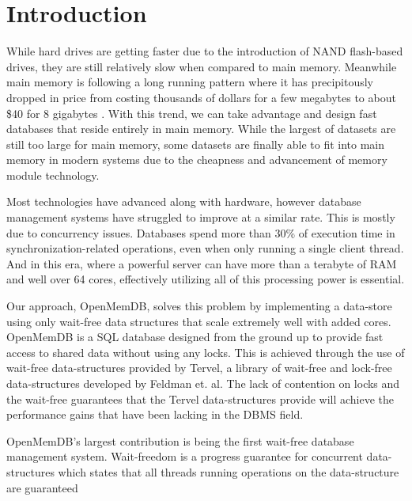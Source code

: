 \documentclass[conference, compsoc]{IEEEtran}
\begin{document}
\section{Introduction}
While hard drives are getting faster due to the introduction of NAND flash-based drives,
they are still relatively slow when compared to main memory. Meanwhile main memory is 
following a long running pattern where it has precipitously dropped in price from costing 
thousands of dollars for a few megabytes to about \$40 for 8 gigabytes \cite{jcmit}. 
With this trend, we can take advantage and design fast databases that reside entirely in main memory. While the largest of datasets are still too large for main memory, 
some datasets are finally able to fit into main memory in modern systems due to the 
cheapness and advancement of memory module technology. 
\par\vspace{\baselineskip}
Most technologies have advanced 
along with hardware, however database management systems have struggled to improve
at a similar rate. This is mostly due to concurrency issues. Databases spend more than 30\% 
of execution time in synchronization-related operations, even when only running a single
client thread\cite{soares2015database}. And in this era, where a powerful server
can have more than a terabyte of RAM and well over 64 cores, effectively utilizing all of 
this processing power is essential. 
\par\vspace{\baselineskip}
Our approach, OpenMemDB, solves this problem by implementing a data-store 
using only wait-free data structures that scale extremely well with added cores. 
OpenMemDB is a SQL database designed from the ground up to provide fast access to shared
data without using any locks. This is achieved through the use of wait-free
data-structures provided by Tervel, a library of wait-free and lock-free data-structures
developed by Feldman et. al\cite{tervel:hazard_pointer}\cite{tervel:hash_map}\cite{tervel:vector}. The lack of contention on locks and the wait-free
guarantees that the Tervel data-structures provide will achieve the performance gains that 
have been lacking in the DBMS field. 
\par\vspace{\baselineskip}
OpenMemDB's largest contribution is being the first wait-free database 
management system. Wait-freedom is a progress guarantee for concurrent data-structures 
which states that all threads running operations on the data-structure are guaranteed 
\end{document}
